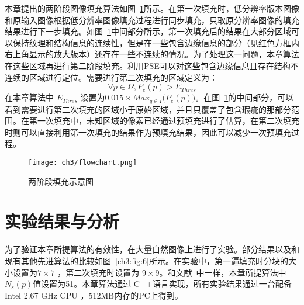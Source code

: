 本章提出的两阶段图像填充算法如图~\ref{ch3:fig:5}所示。在第一次填充时，低分辨率版本图像和原输入图像根据低分辨率图像填充过程进行同步填充，只取原分辨率图像的填充结果进行下一步填充。如图~\ref{ch3:fig:5}中间部分所示，第一次填充后的结果在大部分区域可以保持纹理和结构信息的连续性，但是在一些包含边缘信息的部分（见红色方框内右上角显示的放大版本）还存在一些不连续的情况。为了处理这一问题，本章算法在这些区域再进行第二阶段填充。利用PSE可以对这些包含边缘信息且存在结构不连续的区域进行定位。需要进行第二次填充的区域定义为：
$$\forall p \in \Omega, P_e(p)>E_{Thres}$$
在本章算法中 \(E_{Thres}\) 设置为\(0.015 \times Max_{q\in{I}}{(P_e(p)})\)。在图~\ref{ch3:fig:5}的中间部分，可以看到需要进行第二次填充的区域小于原始区域，并且只覆盖了包含瑕疵的那部分范围。在第一次填充中，未知区域的像素已经通过预填充进行了估算，在第二次填充时则可以直接利用第一次填充的结果作为预填充结果，因此可以减少一次预填充过程。

\begin{figure}[!htbp]
\begin{center}
  \texttt{[image: ch3/flowchart.png]}
\end{center}
\caption{两阶段填充示意图}
\label{ch3:fig:5}       %
\end{figure}

 \section{实验结果与分析}
 \label{cha3:results}
为了验证本章所提算法的有效性，在大量自然图像上进行了实验。部分结果以及和现有其他先进算法\cite{Criminisi04regionfilling,Xu:2010}的比较如图~\ref{ch3:fig:6}所示。在实验中，第一遍填充时分块的大小设置为\(7\times7\) ，第二次填充时设置为 \(9\times9\)。和文献~中一样，本章所提算法中\(N_s(p)\)值设置为51。本章算法通过 C++语言实现，所有实验结果通过一台配备  Intel 2.67 GHz CPU ，512MB内存的PC上得到。\par


